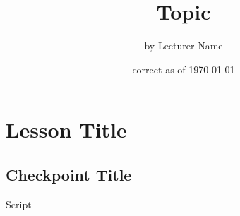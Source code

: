 \documentclass[DIV=classic,11pt,numbers=noenddot,parskip]{scrartcl}
\title{Topic}
\author{by Lecturer Name}
\date{\small correct as of \today}
\begin{document}
\maketitle
\tableofcontents
\newpage
\section{Lesson Title}
\subsection{Checkpoint Title}
Script
\newpage
\end{document}
